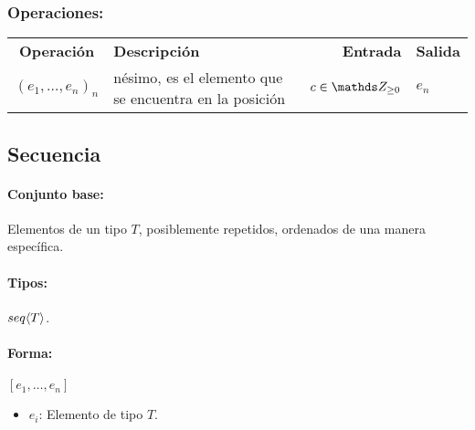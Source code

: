 \subsubsection*{Operaciones:}
\begin{tabular}{cp{6cm}rl}
	\textbf{Operación} & \textbf{Descripción} & \textbf{Entrada} & \textbf{Salida} \\
	$( e_1,\dots,e_n)_n$ &  nésimo, es el elemento que se encuentra en la posición & $c\in\ent_{\geq0}$ & $e_n$\\
\end{tabular}

\subsection{Secuencia}
\paragraph{Conjunto base:} Elementos de un tipo $T$, posiblemente repetidos, ordenados de una manera específica.

\paragraph{Tipos:} $seq \langle T\rangle$.
\paragraph{Forma:}
\begin{center}
	$[ e_1,\dots,e_n ]	$
\end{center}
\begin{itemize}
	\item $e_i$: Elemento de tipo $T$.
\end{itemize}

